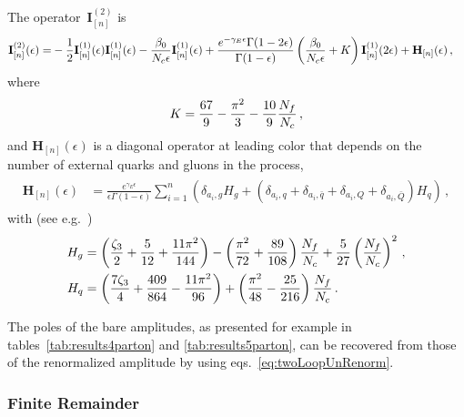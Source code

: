 The operator~$\mathbf{I}^{(2)}_{[n]}$ is
\begin{align}
  \label{eqn:Iop}
  \begin{split} 
    \mathbf{I}^{(2)}_{[n]}(\epsilon)=&
    -\frac{1}{2}\mathbf{I}^{(1)}_{[n]}(\epsilon)\mathbf{I}^{(1)}_{[n]}(\epsilon)
    -\frac{\beta_0}{{N_c}\epsilon}\mathbf{I}^{(1)}_{[n]}(\epsilon) + 
    \frac{e^{-\gamma_E\epsilon}\Gamma(1-2\epsilon)}
    {\Gamma(1-\epsilon)}
    \left(\frac{\beta_0}{{N_c}\epsilon}+K\right)
    \mathbf{I}^{(1)}_{[n]}(2\epsilon) + 
    \mathbf{H}_{[n]}(\epsilon)\,,
  \end{split}
\end{align}
where 
\begin{equation}
K=\frac{67}{9}-\frac{\pi ^2}{3}-\frac{10}{9}\frac{{N_f}}{{N_c}}\,,
\end{equation}
and $\mathbf{H}_{[n]}(\epsilon)$ is a diagonal operator at 
leading color that depends on the number of external quarks 
and gluons in the process,
\begin{align}
  \begin{split}
    \mathbf{H}_{[n]}(\epsilon)&=
    \frac{e^{\gamma_E\epsilon}}{\epsilon\Gamma(1-\epsilon)}
    \sum_{i=1}^n\left(
    \delta_{a_i,g}H_g+
    (\delta_{a_i,q}+\delta_{a_i,\bar q}
    +\delta_{a_i,Q}+\delta_{a_i,\bar Q})
    H_q
    \right)\,,
  \end{split}
\end{align}
with (see e.g.\ \cite{Bern:2003ck})
\begin{align}
  \begin{split}
    H_g&= \left(\frac{\zeta_3}{2}+\frac{5}{12}+
    \frac{11\pi^2}{144}\right)
    -\left(\frac{\pi^2}{72}+\frac{89}{108}\right)\frac{N_f}{{N_c}}
    +\frac{5}{27}\left(\frac{N_f}{{N_c}}\right)^2\,,\\
    H_q&=
    \left(\frac{7\zeta_3}{4}+\frac{409}{864}
    -\frac{11\pi^2}{96}\right)
    +\left(\frac{\pi^2}{48}-\frac{25}{216}\right)\frac{N_f}{{N_c}}\,.
  \end{split}
\end{align}

The poles of the bare amplitudes, as presented for example in
tables~\ref{tab:results4parton} and \ref{tab:results5parton}, can be recovered
from those of the renormalized amplitude by using
eqs.~\eqref{eq:twoLoopUnRenorm}.

\subsubsection{Finite Remainder}\label{sec:remainders}

